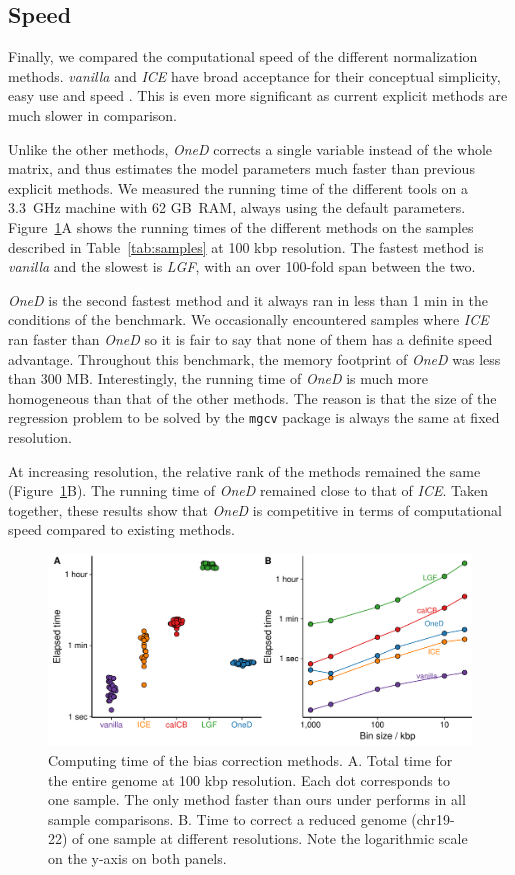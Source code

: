 \documentclass{bioinfo}
\begin{document}
\subsection{Speed}

Finally, we compared the computational speed of the different
normalization methods. \textit{vanilla} and \textit{ICE} have broad acceptance
for their conceptual simplicity, easy use and
speed \citep{imakaev2012iterative}. This is even more significant as current
explicit methods \citep{servant2012hitc} are much slower in comparison.

Unlike the other methods, \textit{OneD} corrects a single variable instead
of the whole matrix, and thus estimates the model parameters much faster
than previous explicit methods. We measured the running time of the
different tools on a 3.3~GHz machine with 62 GB~RAM, always using the
default parameters. Figure~\ref{fig:times}A shows the running times of the
different methods on the samples described in Table~\ref{tab:samples} at
100 kbp resolution. The fastest method is \textit{vanilla} and the slowest
is \textit{LGF}, with an over 100-fold span between the two.

\textit{OneD} is the second fastest method and it always ran in less than
1 min in the conditions of the benchmark. We occasionally encountered
samples where \textit{ICE} ran faster than \textit{OneD} so it is fair to
say that none of them has a definite speed advantage. Throughout this
benchmark, the memory footprint of \textit{OneD} was less than 300 MB.
Interestingly, the running time of \textit{OneD} is much more homogeneous
than that of the other methods. The reason is that the size of the
regression problem to be solved by the \texttt{mgcv} package is always the
same at fixed resolution.

At increasing resolution, the relative rank of the methods remained the
same (Figure~\ref{fig:times}B). The running time of \textit{OneD} remained
close to that of \textit{ICE}. Taken together, these results show that
\textit{OneD} is competitive in terms of computational speed compared to
existing methods.

\begin{figure}
\centerline{\includegraphics[width=.5\textwidth]
  {img/figure_benchmark_time.pdf}}
\caption{
Computing time of the bias correction methods. A. Total time for the
entire genome at 100 kbp resolution. Each dot corresponds to one sample.
The only method faster than ours under performs in all sample comparisons.
B. Time to correct a reduced genome (chr19-22) of one sample at different
resolutions. Note the logarithmic scale on the y-axis on both panels.}
\label{fig:times}
\end{figure}
\end{document}
